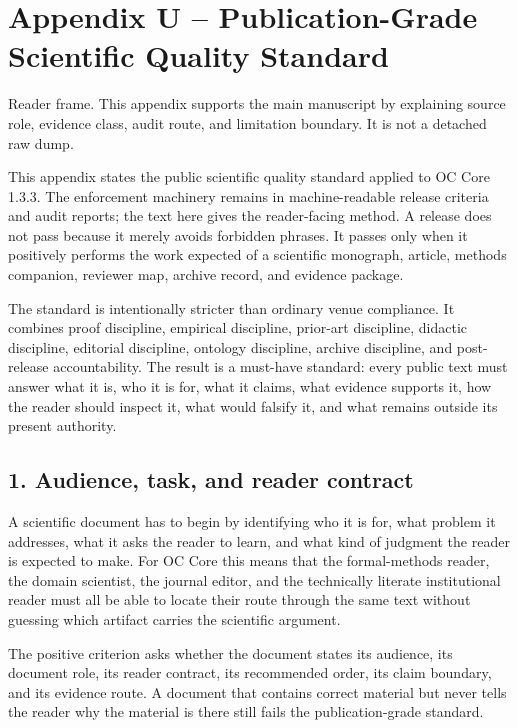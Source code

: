\section{Appendix U -- Publication-Grade Scientific Quality Standard}
Reader frame. This appendix supports the main manuscript by explaining source role, evidence class, audit route, and limitation boundary. It is not a detached raw dump.


\label{sec:oc133-public-scientific-quality-standard}

This appendix states the public scientific quality standard applied to OC Core 1.3.3. The enforcement machinery remains in machine-readable release criteria and audit reports; the text here gives the reader-facing method. A release does not pass because it merely avoids forbidden phrases. It passes only when it positively performs the work expected of a scientific monograph, article, methods companion, reviewer map, archive record, and evidence package.


The standard is intentionally stricter than ordinary venue compliance. It combines proof discipline, empirical discipline, prior-art discipline, didactic discipline, editorial discipline, ontology discipline, archive discipline, and post-release accountability. The result is a must-have standard: every public text must answer what it is, who it is for, what it claims, what evidence supports it, how the reader should inspect it, what would falsify it, and what remains outside its present authority.


\subsection{1. Audience, task, and reader contract}

A scientific document has to begin by identifying who it is for, what problem it addresses, what it asks the reader to learn, and what kind of judgment the reader is expected to make. For OC Core this means that the formal-methods reader, the domain scientist, the journal editor, and the technically literate institutional reader must all be able to locate their route through the same text without guessing which artifact carries the scientific argument.


The positive criterion asks whether the document states its audience, its document role, its reader contract, its recommended order, its claim boundary, and its evidence route. A document that contains correct material but never tells the reader why the material is there still fails the publication-grade standard.


